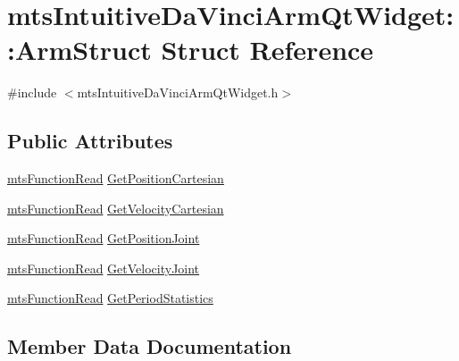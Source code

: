 \hypertarget{structmts_intuitive_da_vinci_arm_qt_widget_1_1_arm_struct}{}\section{mts\+Intuitive\+Da\+Vinci\+Arm\+Qt\+Widget\+:\+:Arm\+Struct Struct Reference}
\label{structmts_intuitive_da_vinci_arm_qt_widget_1_1_arm_struct}


{\ttfamily \#include $<$mts\+Intuitive\+Da\+Vinci\+Arm\+Qt\+Widget.\+h$>$}

\subsection*{Public Attributes}
\begin{DoxyCompactItemize}
\item 
\hyperlink{classmts_function_read}{mts\+Function\+Read} \hyperlink{structmts_intuitive_da_vinci_arm_qt_widget_1_1_arm_struct_af42ba720f4c5ca40c712825df4839b68}{Get\+Position\+Cartesian}
\item 
\hyperlink{classmts_function_read}{mts\+Function\+Read} \hyperlink{structmts_intuitive_da_vinci_arm_qt_widget_1_1_arm_struct_ae2d860fd82111f8496a9c9047154e082}{Get\+Velocity\+Cartesian}
\item 
\hyperlink{classmts_function_read}{mts\+Function\+Read} \hyperlink{structmts_intuitive_da_vinci_arm_qt_widget_1_1_arm_struct_aa84dcdba701199214b3164fe99e1cc8c}{Get\+Position\+Joint}
\item 
\hyperlink{classmts_function_read}{mts\+Function\+Read} \hyperlink{structmts_intuitive_da_vinci_arm_qt_widget_1_1_arm_struct_ab26d7fde80beb11e4c052e80d6b8c60b}{Get\+Velocity\+Joint}
\item 
\hyperlink{classmts_function_read}{mts\+Function\+Read} \hyperlink{structmts_intuitive_da_vinci_arm_qt_widget_1_1_arm_struct_aee208e888d10d04aeb22cea102c57350}{Get\+Period\+Statistics}
\end{DoxyCompactItemize}


\subsection{Member Data Documentation}
\hypertarget{structmts_intuitive_da_vinci_arm_qt_widget_1_1_arm_struct_aee208e888d10d04aeb22cea102c57350}{}
